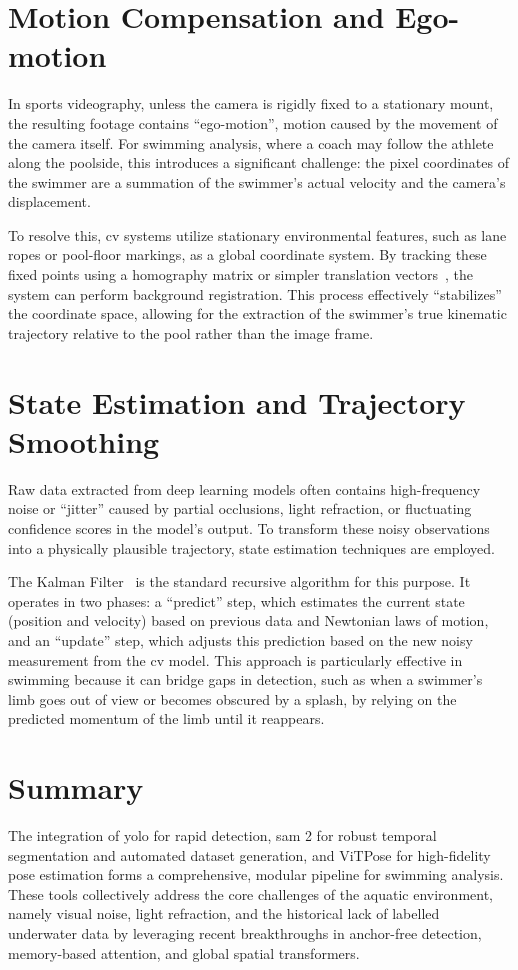 \section{Motion Compensation and Ego-motion}
In sports videography, unless the camera is rigidly fixed to a stationary mount, the resulting footage contains ``ego-motion'', motion caused by the movement of the camera itself. For swimming analysis, where a coach may follow the athlete along the poolside, this introduces a significant challenge: the pixel coordinates of the swimmer are a summation of the swimmer's actual velocity and the camera's displacement.

To resolve this, \gls{cv} systems utilize stationary environmental features, such as lane ropes or pool-floor markings, as a global coordinate system. By tracking these fixed points using a homography matrix or simpler translation vectors~\cite{hartley2003multiple}, the system can perform background registration. This process effectively ``stabilizes'' the coordinate space, allowing for the extraction of the swimmer's true kinematic trajectory relative to the pool rather than the image frame.



\section{State Estimation and Trajectory Smoothing}
Raw data extracted from deep learning models often contains high-frequency noise or ``jitter'' caused by partial occlusions, light refraction, or fluctuating confidence scores in the model's output. To transform these noisy observations into a physically plausible trajectory, state estimation techniques are employed.

The Kalman Filter~\cite{kalman1960new} is the standard recursive algorithm for this purpose. It operates in two phases: a ``predict'' step, which estimates the current state (position and velocity) based on previous data and Newtonian laws of motion, and an ``update'' step, which adjusts this prediction based on the new noisy measurement from the \gls{cv} model. This approach is particularly effective in swimming because it can bridge gaps in detection, such as when a swimmer's limb goes out of view or becomes obscured by a splash, by relying on the predicted momentum of the limb until it reappears.

\section{Summary}
The integration of \gls{yolo} for rapid detection, \gls{sam} 2 for robust temporal segmentation and automated dataset generation, and ViTPose for high-fidelity pose estimation forms a comprehensive, modular pipeline for swimming analysis. These tools collectively address the core challenges of the aquatic environment, namely visual noise, light refraction, and the historical lack of labelled underwater data by leveraging recent breakthroughs in anchor-free detection, memory-based attention, and global spatial transformers. 

